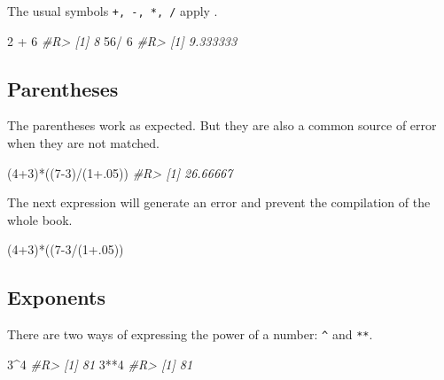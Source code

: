 \documentclass[]{book}
\newenvironment{Shaded}{}{}
\newcommand{\CommentTok}[1]{\textcolor[rgb]{0.38,0.63,0.69}{\textit{#1}}}
\newcommand{\DecValTok}[1]{\textcolor[rgb]{0.25,0.63,0.44}{#1}}
\newcommand{\FloatTok}[1]{\textcolor[rgb]{0.25,0.63,0.44}{#1}}
\newcommand{\NormalTok}[1]{#1}
\newcommand{\OperatorTok}[1]{\textcolor[rgb]{0.40,0.40,0.40}{#1}}
\newcommand{\StringTok}[1]{\textcolor[rgb]{0.25,0.44,0.63}{#1}}
\theoremstyle{definition}
\theoremstyle{definition}
\theoremstyle{definition}
\theoremstyle{remark}
\begin{document}
The usual symbols \texttt{+,\ -,\ *,\ /} apply .

\begin{Shaded}
\begin{Highlighting}[]
\DecValTok{2} \OperatorTok{+}\StringTok{ }\DecValTok{6}
\CommentTok{#R> [1] 8}
\DecValTok{56}\OperatorTok{/}\StringTok{ }\DecValTok{6}
\CommentTok{#R> [1] 9.333333}
\end{Highlighting}
\end{Shaded}

\hypertarget{parentheses}{%
\subsection{Parentheses}\label{parentheses}}

The parentheses work as expected. But they are also a common source of
error when they are not matched.

\begin{Shaded}
\begin{Highlighting}[]
\NormalTok{(}\DecValTok{4}\OperatorTok{+}\DecValTok{3}\NormalTok{)}\OperatorTok{*}\NormalTok{((}\DecValTok{7-3}\NormalTok{)}\OperatorTok{/}\NormalTok{(}\DecValTok{1}\FloatTok{+.05}\NormalTok{))}
\CommentTok{#R> [1] 26.66667}
\end{Highlighting}
\end{Shaded}

The next expression will generate an error and prevent the compilation
of the whole book.

\begin{Shaded}
\begin{Highlighting}[]
\NormalTok{(}\DecValTok{4}\OperatorTok{+}\DecValTok{3}\NormalTok{)}\OperatorTok{*}\NormalTok{((}\DecValTok{7-3}\OperatorTok{/}\NormalTok{(}\DecValTok{1}\FloatTok{+.05}\NormalTok{))}
\end{Highlighting}
\end{Shaded}

\hypertarget{exponents}{%
\subsection{Exponents}\label{exponents}}

There are two ways of expressing the power of a number: \texttt{\^{}}
and \texttt{**}.

\begin{Shaded}
\begin{Highlighting}[]
\DecValTok{3}\OperatorTok{^}\DecValTok{4}
\CommentTok{#R> [1] 81}
\DecValTok{3}\OperatorTok{**}\DecValTok{4}
\CommentTok{#R> [1] 81}
\end{Highlighting}
\end{Shaded}
\end{document}
